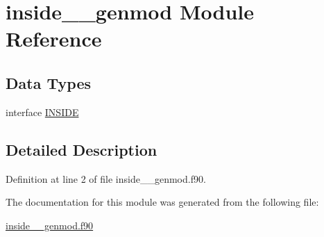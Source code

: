 \hypertarget{classinside____genmod}{\section{inside\+\_\+\+\_\+genmod Module Reference}
\label{classinside____genmod}
}
\subsection*{Data Types}
\begin{DoxyCompactItemize}
\item 
interface \hyperlink{interfaceinside____genmod_1_1INSIDE}{I\+N\+S\+I\+D\+E}
\end{DoxyCompactItemize}


\subsection{Detailed Description}


Definition at line 2 of file inside\+\_\+\+\_\+genmod.\+f90.



The documentation for this module was generated from the following file\+:\begin{DoxyCompactItemize}
\item 
\hyperlink{inside____genmod_8f90}{inside\+\_\+\+\_\+genmod.\+f90}\end{DoxyCompactItemize}
